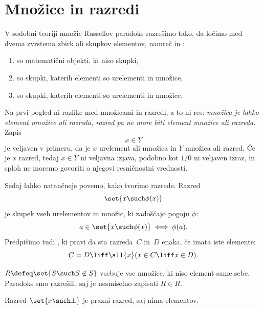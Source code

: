 \section{Množice in razredi}

V sodobni teoriji množic Russellov paradoks razrešimo tako, da ločimo med dvema
zvrstema zbirk ali skupkov elementov, namreč  in :
%
\begin{enumerate}
\item {} so matematični objekti, ki niso skupki,
\item {} so skupki, katerih elementi so urelementi in množice,
\item {} so skupki, katerih elementi so urelementi in množice.
\end{enumerate}
%
Na prvi pogled ni razlike med množicami in razredi, a to ni res:
\emph{množica je lahko element množice ali razreda,
razred pa ne more biti element množice ali razreda.}
%
Zapis
%
\begin{equation*}
    x \in Y
  \end{equation*}
%
je veljaven v primeru, da je $x$ urelement ali množica in $Y$ množica ali razred.
Če je $x$ razred, tedaj $x \in Y$ ni veljavna izjava, podobno kot $1/0$ ni veljaven izraz, in sploh ne moremo govoriti o njegovi resničnostni vrednosti.

Sedaj lahko natančneje povemo, kako tvorimo razrede. Razred
%
\begin{equation*}
  \set{ x \such \phi(x) }
\end{equation*}
%
je skupek vseh urelementov in množic, ki zadoščajo pogoju $\phi$:
%
\begin{equation*}
    a \in \set{ x \such \phi(x) } \iff \phi(a).
\end{equation*}
%
Predpišimo tudi , ki pravi da sta razreda~$C$ in~$D$ enaka, če imata iste elemente:
%
\begin{equation*}
  C = D \liff \all{x} (x \in C \liff x \in D).
\end{equation*}

\begin{zgled}
   $R \defeq \set{ S \such S \not\in S }$ vsebuje vse množice, ki niso element same sebe. Paradoks smo razrešili, saj je nesmiselno zapisati $R \in R$.
\end{zgled}

\begin{zgled}
  Razred $\set{x \such \bot}$ je prazni razred, saj nima elementov.
\end{zgled}

